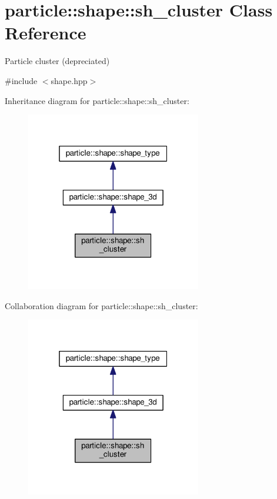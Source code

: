 \hypertarget{classparticle_1_1shape_1_1sh__cluster}{}\section{particle\+:\+:shape\+:\+:sh\+\_\+cluster Class Reference}
\label{classparticle_1_1shape_1_1sh__cluster}


Particle cluster (depreciated)  




{\ttfamily \#include $<$shape.\+hpp$>$}



Inheritance diagram for particle\+:\+:shape\+:\+:sh\+\_\+cluster\+:\nopagebreak
\begin{figure}[H]
\begin{center}
\leavevmode
\includegraphics[width=217pt]{d8/d55/classparticle_1_1shape_1_1sh__cluster__inherit__graph}
\end{center}
\end{figure}


Collaboration diagram for particle\+:\+:shape\+:\+:sh\+\_\+cluster\+:\nopagebreak
\begin{figure}[H]
\begin{center}
\leavevmode
\includegraphics[width=217pt]{d6/d9e/classparticle_1_1shape_1_1sh__cluster__coll__graph}
\end{center}
\end{figure}
